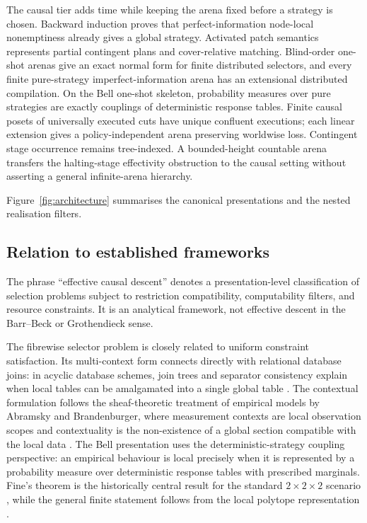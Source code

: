 \documentclass[11pt]{article}
\theoremstyle{plain}
\theoremstyle{definition}
\theoremstyle{remark}
\begin{document}
The causal tier adds time while keeping the arena fixed before a strategy is
chosen. Backward induction proves that perfect-information node-local
nonemptiness already gives a global strategy. Activated patch semantics
represents partial contingent plans and cover-relative matching. Blind-order
one-shot arenas give an exact normal form for finite distributed selectors, and
every finite pure-strategy imperfect-information arena has an extensional
distributed compilation. On the Bell one-shot skeleton, probability measures over
pure strategies are exactly couplings of deterministic response tables. Finite
causal posets of universally executed cuts have unique confluent executions;
each linear extension gives a policy-independent arena preserving worldwise
loss. Contingent stage occurrence remains tree-indexed. A bounded-height
countable arena transfers the halting-stage effectivity obstruction to the
causal setting without asserting a general infinite-arena hierarchy.

Figure~\ref{fig:architecture} summarises the canonical presentations and the
nested realisation filters.

\subsection*{Relation to established frameworks}

The phrase ``effective causal descent'' denotes a presentation-level
classification of selection problems subject to restriction compatibility,
computability filters, and resource constraints. It is an analytical framework,
not effective descent in the Barr--Beck or Grothendieck sense.

The fibrewise selector problem is closely related to uniform constraint
satisfaction. Its multi-context form connects directly with relational database
joins: in acyclic database schemes, join trees and separator consistency explain
when local tables can be amalgamated into a single global table
\cite{beerifagin}. The contextual formulation follows the sheaf-theoretic
treatment of empirical models by Abramsky and Brandenburger, where measurement
contexts are local observation scopes and contextuality is the non-existence of a
global section compatible with the local data \cite{abramsky}. The Bell
presentation uses the deterministic-strategy coupling perspective: an empirical
behaviour is local precisely when it is represented by a probability measure over
deterministic response tables with prescribed marginals. Fine's theorem is the
historically central result for the standard $2\times2\times2$ scenario
\cite{fine}, while the general finite statement follows from the local polytope
representation \cite{pitowsky}.
\end{document}
